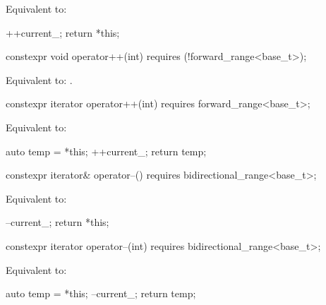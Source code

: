 \begin{itemdescr}
\pnum
\effects
Equivalent to:
\begin{codeblock}
++current_;
return *this;
\end{codeblock}
\end{itemdescr}

%
\begin{itemdecl}
constexpr void operator++(int) requires (!forward_range<base_t>);
\end{itemdecl}

\begin{itemdescr}
\pnum
\effects
Equivalent to: .
\end{itemdescr}

%
\begin{itemdecl}
constexpr iterator operator++(int) requires forward_range<base_t>;
\end{itemdecl}

\begin{itemdescr}
\pnum
\effects
Equivalent to:
\begin{codeblock}
auto temp = *this;
++current_;
return temp;
\end{codeblock}
\end{itemdescr}

%
\begin{itemdecl}
constexpr iterator& operator--() requires bidirectional_range<base_t>;
\end{itemdecl}

\begin{itemdescr}
\pnum
\effects
Equivalent to:
\begin{codeblock}
--current_;
return *this;
\end{codeblock}
\end{itemdescr}

%
\begin{itemdecl}
constexpr iterator operator--(int) requires bidirectional_range<base_t>;
\end{itemdecl}

\begin{itemdescr}
\pnum
\effects
Equivalent to:
\begin{codeblock}
auto temp = *this;
--current_;
return temp;
\end{codeblock}
\end{itemdescr}

